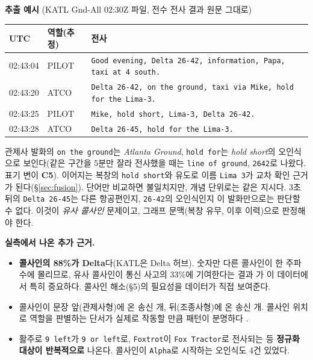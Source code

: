 \documentclass[10pt,a4paper]{article}
\newcommand{\cmd}[1]{\textsf{\small #1}}
\newcommand{\ch}[1]{\textbf{\textcolor{red!60!black}{#1}}}
\begin{document}
\vspace{6pt}
\noindent\textbf{추출 예시} (KATL \cmd{Gnd-All} 02:30Z 파일, 전수 전사 결과 원문 그대로)
\begin{center}\small
\begin{tabularx}{\textwidth}{@{}l l >{\raggedright\arraybackslash}X@{}}
\toprule
UTC & 역할(추정) & 전사\\\midrule
02:43:04 & PILOT & \texttt{Good evening, Delta 26-42, information, Papa, taxi at 4 south.}\\
02:43:20 & ATCO & \texttt{Delta 26-42, on the ground, taxi via Mike, hold for the Lima-3.}\\
02:43:25 & PILOT & \texttt{Mike, hold short, Lima-3, Delta 26-42.}\\
02:43:28 & ATCO & \texttt{Delta 26-45, hold for the Lima-3.}\\
\bottomrule
\end{tabularx}
\end{center}
\noindent 관제사 발화의 \texttt{on the ground}는 \emph{Atlanta Ground}, \texttt{hold for}는 \emph{hold short}의 오인식으로 보인다(같은 구간을 5분만 잘라 전사했을 때는 \texttt{line of ground}, \texttt{2642}로 나왔다. 표기 변이 \ch{C5}). 이어지는 복창의 \texttt{hold short}와 유도로 이름 \texttt{Lima 3}가 교차 확인 근거가 된다(\S\ref{sec:fusion}). 단어만 비교하면 불일치지만, 개념 단위로는 같은 지시다. 3초 뒤의 \texttt{Delta 26-45}는 다른 항공편인지, \texttt{26-42}의 오인식인지 이 발화만으로는 판단할 수 없다. 이것이 \emph{유사 콜사인} 문제이고, 그래프 문맥(복창 유무, 이후 이력)으로 판정해야 한다.

\begin{addbox}
\textbf{실측에서 나온 추가 근거.}
\begin{itemize}[leftmargin=12pt]
\item \textbf{콜사인의 88\%가 Delta}다(KATL은 Delta 허브). 숫자만 다른 콜사인이 한 주파수에 몰리므로, 유사 콜사인이 통신 사고의 33\%에 기여한다는 결과 \cite{eurocontrol}가 이 데이터에서 특히 중요하다. 콜사인 해소(\S5)의 필요성을 데이터가 직접 보여준다.
\item 콜사인이 문장 앞(관제사형)에 온 송신 \nCSfirst{}개, 뒤(조종사형)에 온 송신 \nCSlast{}개. 콜사인 위치로 역할을 판별하는 단서가 실제로 작동할 만큼 패턴이 분명하다 \cite{bertraffic}.
\item 활주로 \texttt{9 left}가 \texttt{9 or left}로, \texttt{Foxtrot}이 \texttt{Fox Tractor}로 전사되는 등 \textbf{정규화 대상이 반복적으로} 나온다. 콜사인이 \texttt{Alpha}로 시작하는 오인식도 4건 있었다.
\end{itemize}
\end{addbox}
\end{document}
